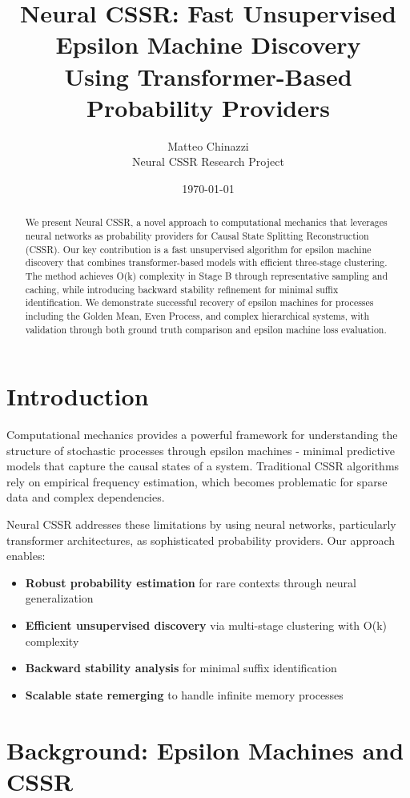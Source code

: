 \documentclass[12pt]{article}
\title{Neural CSSR: Fast Unsupervised Epsilon Machine Discovery \\
       Using Transformer-Based Probability Providers}
\author{
    Matteo Chinazzi \\
    Neural CSSR Research Project
}
\date{\today}
\begin{document}
\maketitle

\begin{abstract}
We present Neural CSSR, a novel approach to computational mechanics that leverages neural networks as probability providers for Causal State Splitting Reconstruction (CSSR). Our key contribution is a fast unsupervised algorithm for epsilon machine discovery that combines transformer-based models with efficient three-stage clustering. The method achieves O(k) complexity in Stage B through representative sampling and caching, while introducing backward stability refinement for minimal suffix identification. We demonstrate successful recovery of epsilon machines for processes including the Golden Mean, Even Process, and complex hierarchical systems, with validation through both ground truth comparison and epsilon machine loss evaluation.
\end{abstract}

\section{Introduction}

Computational mechanics provides a powerful framework for understanding the structure of stochastic processes through epsilon machines - minimal predictive models that capture the causal states of a system. Traditional CSSR algorithms rely on empirical frequency estimation, which becomes problematic for sparse data and complex dependencies.

Neural CSSR addresses these limitations by using neural networks, particularly transformer architectures, as sophisticated probability providers. Our approach enables:

\begin{itemize}
    \item \textbf{Robust probability estimation} for rare contexts through neural generalization
    \item \textbf{Efficient unsupervised discovery} via multi-stage clustering with O(k) complexity
    \item \textbf{Backward stability analysis} for minimal suffix identification
    \item \textbf{Scalable state remerging} to handle infinite memory processes
\end{itemize}

\section{Background: Epsilon Machines and CSSR}
\end{document}
